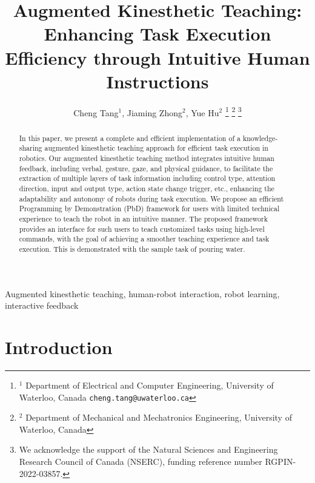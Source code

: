 \documentclass[conference]{IEEEtran}
\begin{document}
\newcommand{\todo}[1]{{\color{red}#1}}

\title{Augmented Kinesthetic Teaching: Enhancing Task Execution Efficiency through Intuitive Human Instructions}

\author{Cheng Tang$^{1}$, Jiaming Zhong$^{2}$, Yue Hu$^{2}$
\thanks{$^{1}$ Department of Electrical and Computer Engineering, University of Waterloo, Canada {\tt\footnotesize cheng.tang@uwaterloo.ca}}
\thanks{$^{2}$ Department of Mechanical and Mechatronics Engineering, University of Waterloo, Canada}
\thanks{We acknowledge the support of the Natural Sciences and Engineering Research Council of Canada (NSERC), funding reference number RGPIN-2022-03857.}
}

\maketitle

\begin{abstract}

In this paper, we present a complete and efficient implementation of a knowledge-sharing augmented kinesthetic teaching approach for efficient task execution in robotics. Our augmented kinesthetic teaching method integrates intuitive human feedback, including verbal, gesture, gaze, and physical guidance, to facilitate the extraction of multiple layers of task information including control type, attention direction, input and output type, action state change trigger, etc., enhancing the adaptability and autonomy of robots during task execution. We propose an efficient Programming by Demonstration (PbD) framework for users with limited technical experience to teach the robot in an intuitive manner. The proposed framework provides an interface for such users to teach customized tasks using high-level commands, with the goal of achieving a smoother teaching experience and task execution. This is demonstrated with the sample task of pouring water.

\end{abstract}

\begin{IEEEkeywords}
Augmented kinesthetic teaching, human-robot interaction, robot learning, interactive feedback
\end{IEEEkeywords}

\section{Introduction}
\end{document}
